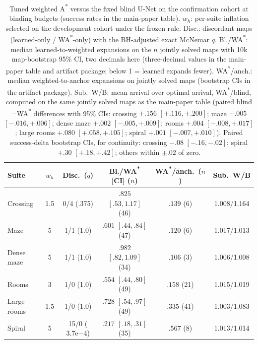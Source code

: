 \documentclass[letterpaper]{article} %
\begin{document}
\begin{table}[t]
\centering
\small
\setlength{\tabcolsep}{1.3pt}
\begin{tabular}{@{}lccccc@{}}
\toprule
Suite & $w_h$ & Disc.\ ($q$) & Bl./WA\textsuperscript{*} [CI] ($n$) & WA\textsuperscript{*}/anch.\ ($n$) & Sub.\ W/B \\
\midrule
Crossing & 1.5 & 0/4 (.375) & $.825$ $[.53,1.17]$ (46) & $.139$ (6) & 1.008/1.164 \\
Maze & 5 & 1/1 (1.0) & $.601$ $[.44,.84]$ (47) & $.120$ (6) & 1.017/1.013 \\
Dense maze & 5 & 1/1 (1.0) & $.982$ $[.82,1.09]$ (34) & $.106$ (3) & 1.006/1.008 \\
Rooms & 3 & 1/0 (1.0) & $.554$ $[.44,.80]$ (49) & $.158$ (21) & 1.015/1.019 \\
Large rooms & 1.5 & 1/0 (1.0) & $.728$ $[.54,.97]$ (49) & $.335$ (41) & 1.003/1.083 \\
Spiral & 5 & 15/0 ($3.7\mathrm{e}{-4}$) & $.217$ $[.18,.31]$ (35) & $.567$ (8) & 1.013/1.014 \\
\bottomrule
\end{tabular}
\caption{Tuned weighted A\textsuperscript{*} versus the fixed blind U-Net on the confirmation cohort at binding budgets (success rates in the main-paper table). $w_h$: per-suite inflation selected on the development cohort under the frozen rule. Disc.: discordant maps (learned-only / WA\textsuperscript{*}-only) with the BH-adjusted exact McNemar $q$. Bl./WA\textsuperscript{*}: median learned-to-weighted expansions on the $n$ jointly solved maps with 10k map-bootstrap 95\% CI, two decimals here (three-decimal values in the main-paper table and artifact package; below 1 = learned expands fewer). WA\textsuperscript{*}/anch.: median weighted-to-anchor expansions on jointly solved maps (bootstrap CIs in the artifact package). Sub.\ W/B: mean arrival over optimal arrival, WA\textsuperscript{*}/blind, computed on the same jointly solved maps as the main-paper table (paired blind$-$WA\textsuperscript{*} differences with 95\% CIs: crossing $+.156$ $[+.116,+.200]$; maze $-.005$ $[-.016,+.006]$; dense maze $+.002$ $[-.005,+.009]$; rooms $+.004$ $[-.008,+.017]$; large rooms $+.080$ $[+.058,+.105]$; spiral $+.001$ $[-.007,+.010]$). Paired success-delta bootstrap CIs, for continuity: crossing $-.08$ $[-.16,-.02]$; spiral $+.30$ $[+.18,+.42]$; others within $\pm.02$ of zero.}
\label{tab:wastar}
\end{table}
\end{document}
